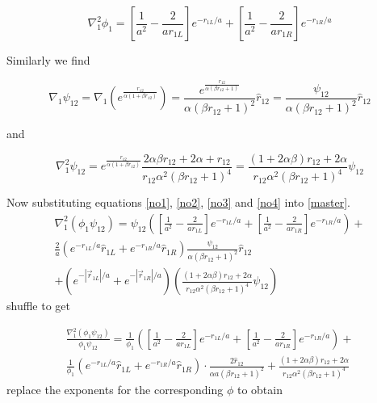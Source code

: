 \documentclass{article}
\begin{document}
\begin{equation}
\label{no2}
 \nabla_1^2\phi_1 =  \left[\frac{1}{a^2}-\frac{2}{a{r}_{1L}} \right] e^{-{r}_{1L}/a} + \left[\frac{1}{a^2}-\frac{2}{a{r}_{1R}} \right] e^{-{r}_{1R}/a} 
\end{equation}

Similarly we find

\begin{equation}
\label{no3}
 \nabla_1 \psi_{12}= \nabla_1 \left( e^{\frac{{r}_{12} }{\alpha(1+\beta {r}_{12})} } \right) = \frac{e^{\frac{r_{12}}{\alpha (\beta r_{12}+1)}}}{\alpha (\beta r_{12}+1)^2}\hat{r}_{12}=\frac{\psi_{12}}{\alpha (\beta r_{12}+1)^2}\hat{r}_{12}
\end{equation}

and 

\begin{equation}
\label{no4}
 \nabla_1^2 \psi_{12}=e^{\frac{r_{12} }{\alpha(1+\beta r_{12} ) }} \frac{2\alpha \beta r_{12} + 2\alpha+r_{12}}{r_{12}\alpha^2(\beta r_{12}+1)^4} =  \frac{(1+2\alpha \beta) r_{12} + 2\alpha}{r_{12}\alpha^2(\beta r_{12}+1)^4} \psi_{12}
\end{equation}

Now substituting equations \ref{no1}, \ref{no2}, \ref{no3} and \ref{no4} into \ref{master}.
\begin{multline}
 \nabla_1^2(\phi_1\psi_{12}) =\psi_{12} \left( \left[\frac{1}{a^2}-\frac{2}{a{r}_{1L}} \right] e^{-{r}_{1L}/a} + \left[\frac{1}{a^2}-\frac{2}{a{r}_{1R}} \right] e^{-{r}_{1R}/a}  \right) +\\ \frac2a \left(  e^{-{r}_{1L}/a}\hat{r}_{1L} +e^{-{r}_{1R}/a}\hat{r}_{1R} \right)\frac{\psi_{12}}{\alpha (\beta r_{12}+1)^2}\hat{r}_{12} \\ +\left( e^{-|\vec{r}_{1L}|/a} + e^{-|\vec{r}_{1R}|/a} \right) \left(   \frac{(1+2\alpha \beta) r_{12} + 2\alpha}{r_{12}\alpha^2(\beta r_{12}+1)^4} \psi_{12} \right)
\end{multline}
shuffle to get

\begin{multline}
 \frac{\nabla_1^2(\phi_1\psi_{12})}{\phi_1 \psi_{12}} =\frac{1}{\phi_1} \left( \left[\frac{1}{a^2}-\frac{2}{ar_{1L}} \right] e^{-r_{1L}/a} + \left[\frac{1}{a^2} - \frac{2}{ar_{1R}} \right] e^{-{r}_{1R}/a}  \right)   
+ \\ \frac{1}{\phi_1 } \left(  e^{-{r}_{1L}/a}\hat{r}_{1L} +e^{-{r}_{1R}/a}\hat{r}_{1R} \right) \cdot \frac{2\hat{r}_{12}}{\alpha a(\beta r_{12}+1)^2}+    \frac{(1+2\alpha \beta) r_{12} 
+ 2\alpha}{r_{12}\alpha^2(\beta r_{12}+1)^4} 
\end{multline}
replace the exponents for the corresponding $\phi$ to obtain
\end{document}
